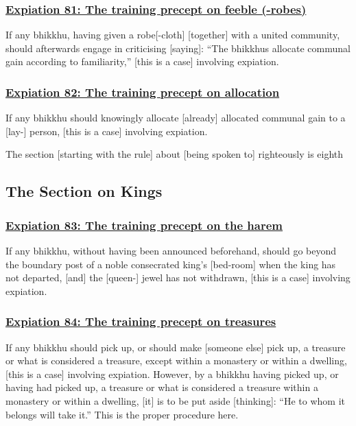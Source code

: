 \subsubsection*{\hyperref[pac81]{Expiation 81: The training precept on feeble (-robes)}}
\label{exp81}
If any bhikkhu, having given a robe[-cloth] [together] with a united community, should afterwards engage in criticising [saying]: ``The bhikkhus allocate communal gain according to familiarity,'' [this is a case] involving expiation.

\subsubsection*{\hyperref[pac82]{Expiation 82: The training precept on allocation}}
\label{exp82}
If any bhikkhu should knowingly allocate [already] allocated communal gain to a [lay-] person, [this is a case] involving expiation.

\begin{center}
  The section [starting with the rule] about [being spoken to] righteously is eighth
\end{center}

\setsubsecheadstyle{\subsectionFmt}
\subsection{The Section on Kings}
\vspace{0.2cm}

\subsubsection*{\hyperref[pac83]{Expiation 83: The training precept on the harem}}
\label{exp83}
If any bhikkhu, without having been announced beforehand, should go beyond the boundary post of a noble consecrated king's [bed-room] when the king has not departed, [and] the [queen-] jewel has not withdrawn, [this is a case] involving expiation.

\subsubsection*{\hyperref[pac84]{Expiation 84: The training precept on treasures}}
\label{exp84}
If any bhikkhu should pick up, or should make [someone else] pick up, a treasure or what is considered a treasure, except within a monastery or within a dwelling, [this is a case] involving expiation. However, by a bhikkhu having picked up, or having had picked up, a treasure or what is considered a treasure within a monastery or within a dwelling, [it] is to be put aside [thinking]: ``He to whom it belongs will take it.'' This is the proper procedure here.

